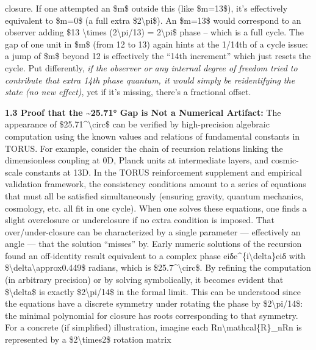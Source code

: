 \documentclass[
]{article}
\begin{document}
closure\hspace{0pt}. If one attempted an \$m\$ outside this (like
\$m=13\$), it's effectively equivalent to \$m=0\$ (a full extra
\$2\textbackslash pi\$). An \$m=13\$ would correspond to an observer
adding \$13 \textbackslash times (2\textbackslash pi/13) =
2\textbackslash pi\$ phase -- which is a full cycle. The gap of one unit
in \$m\$ (from 12 to 13) again hints at the 1/14th of a cycle issue: a
jump of \$m\$ beyond 12 is effectively the ``14th increment'' which just
resets the cycle. Put differently, \emph{if the observer or any internal
degree of freedom tried to contribute that extra 14th phase quantum, it
would simply be reidentifying the state (no new effect)}, yet if it's
missing, there's a fractional offset.

\textbf{1.3 Proof that the \textasciitilde25.71° Gap is Not a Numerical
Artifact:} The appearance of \$25.71\^{}\textbackslash circ\$ can be
verified by high-precision algebraic computation using the known values
and relations of fundamental constants in TORUS. For example, consider
the chain of recursion relations linking the dimensionless coupling at
0D, Planck units at intermediate layers, and cosmic-scale constants at
13D. In the TORUS reinforcement supplement and empirical validation
framework, the consistency conditions amount to a series of equations
that must all be satisfied simultaneously (ensuring gravity, quantum
mechanics, cosmology, etc. all fit in one cycle)\hspace{0pt}. When one
solves these equations, one finds a slight overclosure or underclosure
if no extra condition is imposed. That over/under-closure can be
characterized by a single parameter --- effectively an angle --- that
the solution ``misses'' by. Early numeric solutions of the recursion
found an off-identity result equivalent to a complex phase
eiδe\^{}\{i\textbackslash delta\}eiδ with
\$\textbackslash delta\textbackslash approx0.449\$ radians, which is
\$25.7\^{}\textbackslash circ\$. By refining the computation (in
arbitrary precision) or by solving symbolically, it becomes evident that
\$\textbackslash delta\$ is exactly \$2\textbackslash pi/14\$ in the
formal limit. This can be understood since the equations have a discrete
symmetry under rotating the phase by \$2\textbackslash pi/14\$: the
minimal polynomial for closure has roots corresponding to that symmetry.
For a concrete (if simplified) illustration, imagine each
Rn\textbackslash mathcal\{R\}\_nRn\hspace{0pt} is represented by a
\$2\textbackslash times2\$ rotation matrix\\
\end{document}
